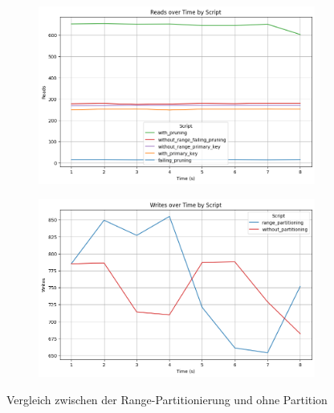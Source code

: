 \vspace{-8pt}
\begin{figure}[H]
	\centering
	\begin{subfigure}[t]{0.48\textwidth}
		\includegraphics[width=\textwidth]{PNGs/Script/Partition/range-partition/Reads}
	\end{subfigure}
	\hfill
	\begin{subfigure}[t]{0.48\textwidth}
		\includegraphics[width=\textwidth]{PNGs/Script/Partition/range-partition/Writes}
	\end{subfigure}
	\vspace{-20pt}
	\caption[Range-Partitionierung: Unterschiedliche Selects mit und ohne Partition]{Vergleich zwischen der Range-Partitionierung und ohne Partition}
	\label{fig:range-partition}
\end{figure}
\vspace{-12pt}

